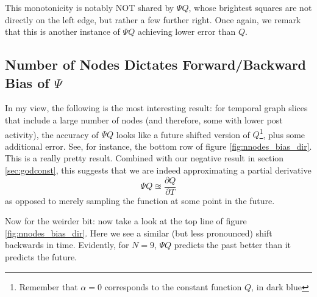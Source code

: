 \documentclass{article}
\theoremstyle{definition}
\begin{document}
	This monotonicity is notably NOT shared by $\Psi Q$, whose brightest squares are not directly on the left edge, but rather a few further right. Once again, we remark that this is another instance of $\Psi Q$ achieving lower error than $Q$. 
	

	\vspace{1in}
	
	\subsection{Number of Nodes Dictates Forward/Backward Bias of $\Psi$}\label{sec:futurebias}
	
	In my view, the following is the most interesting result: for temporal graph slices that include a large number of nodes (and therefore, some with lower post activity), the accuracy of $\Psi Q$ looks like a future shifted version of $Q$\footnote{Remember that $\alpha = 0$ corresponds to the constant function $Q$, in dark blue}, plus some additional error. See, for instance, the bottom row of figure \ref{fig:nnodes_bias_dir}. This is a really pretty result. Combined with our negative result in section \ref{sec:godconst}, this suggests that we are indeed approximating a partial derivative 
	\[\Psi Q \approxeq \frac{\partial Q}{\partial T} \]
	as opposed to merely sampling the function at some point in the future.
	
	Now for the weirder bit: now take a look at the top line of figure \ref{fig:nnodes_bias_dir}. Here we see a similar (but less pronounced) shift backwards in time. Evidently, for $N=9$, $\Psi Q$ predicts the past better than it predicts the future.
		
\end{document}
